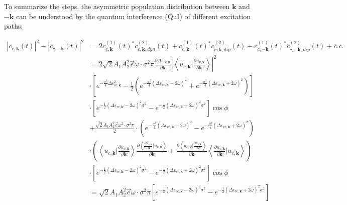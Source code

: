 To summarize the steps, the asymmetric population distribution between $\mathbf k$ and $\mathbf {-k}$  can be understood by the quantum interference (\gls{QuI}) of different excitation paths:

\begin{equation}
    \begin{aligned}
    |c_{c,\mathbf k}(t)|^2-|c_{c,-\mathbf k}(t)|^2&=
 2c^{(1)}_{c,\mathbf k}(t)^* c^{(2)}_{c,\mathbf k,dyn}(t) +c^{(1)}_{c,\mathbf k}(t)^* c^{(2)}_{c,\mathbf k,dip}(t)-c^{(1)}_{c,-\mathbf k}(t)^* c^{(2)}_{c,-\mathbf k,dip}(t) + c.c.\\
 &=2\sqrt{2} A_1 A_2^2 \vec e \omega  \cdot \sigma^2 \pi \frac{\partial  \Delta \epsilon_{vc,\mathbf k}}{\partial \mathbf k} |\left \langle u_{c,\mathbf k}\Big |\frac{\partial u_{v,\mathbf k}}{\partial \mathbf k} \right \rangle|^2 \\
    &\cdot [e^{-\frac{\sigma^2}{4} \Delta \epsilon_{vc,\mathbf k} ^2}-\frac{1}{2}(e^{-\frac{\sigma^2}{4} (\Delta \epsilon_{vc,\mathbf k}-2\omega )^2}+e^{-\frac{\sigma^2}{4} (\Delta \epsilon_{vc,\mathbf k}+2\omega )^2})]\\
    &\cdot[e^{-\frac{1}2{}(\Delta \epsilon_{vc,\mathbf k} - 2\omega )^2 \sigma^2}
    -e^{-\frac{1}{2}(\Delta \epsilon_{vc,\mathbf k} + 2\omega )^2 \sigma^2} ]\cos\phi\\
    &+\frac{\sqrt{2}A_1A_2^2 \vec e \omega ^2 \cdot \sigma^2 \pi}{2}\cdot(e^{-\frac{\sigma^2}{4} (\Delta \epsilon_{vc,\mathbf k}-2\omega )^2}-e^{-\frac{\sigma^2}{4} (\Delta \epsilon_{vc,\mathbf k}+2\omega )^2})\\
    &\cdot (\left \langle u_{c,\mathbf k} \big | \frac{\partial u_{v,\mathbf k}}{\partial \mathbf k}  \right \rangle \frac{\partial{\left \langle\frac{\partial u_{v,\mathbf k}}{\partial \mathbf k}\Big |u_{c,\mathbf k}\right \rangle}}{\partial {\mathbf k}} +
   \frac{\partial{\left \langle u_{c,\mathbf k}\Big |\frac{\partial u_{v,\mathbf k}}{\partial \mathbf k} \right \rangle}}{\partial {\mathbf k}}
    \left \langle \frac{\partial u_{v,\mathbf k}}{\partial \mathbf k} |  u_{c,\mathbf k} \right \rangle)\\
    &\cdot[e^{-\frac{1}{2}(\Delta \epsilon_{vc,\mathbf k} - 2\omega )^2 \sigma^2}
    -e^{-\frac{1}{2}(\Delta \epsilon_{vc,\mathbf k} + 2\omega )^2 \sigma^2} ]\cos\phi\\
    &=\sqrt{2} A_1 A_2^2 \vec e \omega  \cdot \sigma^2 \pi [e^{-\frac{1}2{}(\Delta \epsilon_{vc,\mathbf k} - 2\omega )^2 \sigma^2}
    -e^{-\frac{1}{2}(\Delta \epsilon_{vc,\mathbf k} + 2\omega )^2 \sigma^2} ]\\

\end{aligned}
\end{equation}
